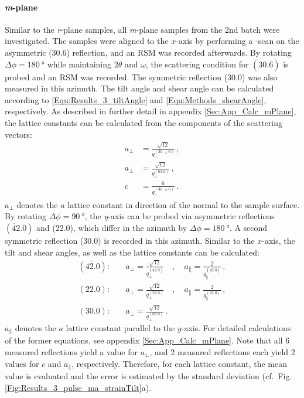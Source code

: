 \paragraph{\textit{m}-plane}
    Similar to the \textit{r}-plane samples, all \textit{m}-plane samples from the 2nd batch were investigated.
    The samples were aligned to the $x$-axis by performing a \textphi-scan on the asymmetric (30.6) reflection, and an \gls{RSM} was recorded afterwards.
    By rotating $\Delta\phi=\qty{180}{\degree}$ while maintaining $2\theta$ and $\omega$, the scattering condition for $(30.\overline{6})$ is probed and an \gls{RSM} was recorded.
    The symmetric reflection (30.0) was also measured in this azimuth.
    The tilt angle and shear angle can be calculated according to \eqref{Equ:Results_3_tiltAngle} and \eqref{Equ:Methods_shearAngle}, respectively.
    As described in further detail in appendix \ref{Sec:App_Calc_mPlane}, the lattice constants can be calculated from the components of the scattering vectors:
    \begin{align}
        a_\perp &= \frac{\sqrt{12}}{q_\perp^{(30.\pm6)}} \,,\\
        a_\perp &= \frac{\sqrt{12}}{q_\perp^{(03.0)}}\,,\\
        c &= \frac{6}{q_\parallel^{(30.\pm6)}} \,.
    \end{align}
    $a_\perp$ denotes the $a$ lattice constant in direction of the normal to the sample surface.
    By rotating $\Delta\phi=\qty{90}{\degree}$, the \textit{y}-axis can be probed via asymmetric reflections $(\overline{4}2.0)$ and (22.0), which differ in the azimuth by $\Delta\phi=\qty{180}{\degree}$.
    A second symmetric reflection (30.0) is recorded in this azimuth.
    Similar to the $x$-axis, the tilt and shear angles, as well as the lattice constants can be calculated:
    \begin{align}
        (4\overline{2}.0):&\quad
            a_\perp = \frac{\sqrt{12}}{q_\perp^{(4\overline{2}.0)}}
            \quad,\quad
            a_\parallel = \frac{2}{q_\parallel^{(4\overline{2}.0)}}\,,\\
        (22.0):&\quad
            a_\perp = \frac{\sqrt{12}}{q_\perp^{(22.0)}}
            \quad,\quad
            a_\parallel = \frac{2}{q_\parallel^{(22.0)}}\,,\\
        (30.0):&\quad
            a_\perp = \frac{\sqrt{12}}{q_\perp^{(03.0)}}\,.
    \end{align}
    $a_\parallel$ denotes the $a$ lattice constant parallel to the $y$-axis.
    For detailed calculations of the former equations, see appendix \ref{Sec:App_Calc_mPlane}.
    Note that all 6 measured reflections yield a value for $a_\perp$, and 2 measured reflections each yield 2 values for $c$ and $a_\parallel$, respectively.
    Therefore, for each lattice constant, the mean value is evaluated and the error is estimated by the standard deviation (cf.\ Fig.\,\ref{Fig:Results_3_pulse_ma_strainTilt}a).

